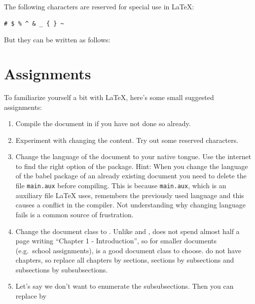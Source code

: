 The following characters are reserved for special use in \LaTeX{}:
\begin{verbatim}
# $ % ^ & _ { } ~
\end{verbatim} 

But they can be written as follows:

\latexone{\# \$ \% \^{} \& \_ \{ \} \~{} \textbackslash{}}


\section{Assignments}
To familiarize yourself a bit with \LaTeX{}, here's some small suggested assignments:
\begin{enumerate}
	\item Compile the document in  if you have not done so already.
	\item Experiment with changing the content. Try out some reserved characters.
	\item Change the language of the document to your native tongue. Use the internet to find the right option of the  package. Hint: When you change the language of the babel package of an already existing document you need to delete the file \verb|main.aux| before compiling. This is because \verb|main.aux|, which is an auxiliary file \LaTeX{} uses, remembers the previously used language and this causes a conflict in the compiler. Not understanding why changing language fails is a common source of frustration.
	\item Change the document class to . Unlike  and ,  does not spend almost half a page writing ``Chapter 1 - Introduction'', so for smaller documents (e.g.\ school assignments),  is a good document class to choose.  do not have chapters, so replace all chapters by sections, sections by subsections and subsections by subsubsections.
	\item Let's say we don't want to enumerate the subsubsections. Then you can replace  by 
\end{enumerate}

